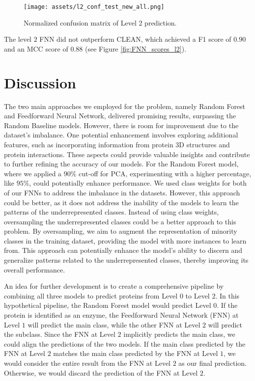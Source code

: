 \documentclass{bioinfo}
\begin{document}
\begin{figure}[!htb]
\texttt{[image: assets/l2\_conf\_test\_new\_all.png]}
\caption{Normalized confusion matrix of Level 2 prediction.}\label{fig:FNN_conf_l2}
\end{figure}

The level $2$ FNN did not outperform CLEAN, which achieved a F1 score of $0.90$ and an MCC score of $0.88$ (see Figure \ref{fig:FNN_scores_l2}).
\section{Discussion}
The two main approaches we employed for the problem, namely Random Forest and Feedforward Neural Network, delivered promising results, surpassing the Random Baseline models.
However, there is room for improvement due to the dataset's imbalance.
One potential enhancement involves exploring additional features, such as incorporating information from protein 3D structures and protein interactions.
These aspects could provide valuable insights and contribute to further refining the accuracy of our models.
For the Random Forest model, where we applied a $90\%$ cut-off for PCA, experimenting with a higher percentage, 
like $95\%$, could potentially enhance performance.
We used class weights for both of our FNNs to address the imbalance in the datasets.
However, this approach could be better, as it does not address the inability of the models to learn the patterns of the underrepresented classes.
Instead of using class weights, oversampling the underrepresented classes could be a better approach to this problem.
By oversampling, we aim to augment the representation of minority classes in the training dataset, 
providing the model with more instances to learn from. 
This approach can potentially enhance the model's ability to discern and generalize patterns related to the underrepresented 
classes, thereby improving its overall performance.

An idea for further development is to create a comprehensive pipeline by combining all three models to predict proteins from Level $0$ to Level $2$.
In this hypothetical pipeline, the Random Forest model would predict Level $0$.
If the protein is identified as an enzyme, the Feedforward Neural Network (FNN) at Level $1$ will predict the main class,
while the other FNN at Level $2$ will predict the subclass.
Since the FNN at Level $2$ implicitly predicts the main class, we could align the predictions of the two models.
If the main class predicted by the FNN at Level $2$ matches the main class predicted by the FNN at Level $1$, 
we would consider the entire result from the FNN at Level $2$ as our final prediction.
Otherwise, we would discard the prediction of the FNN at Level $2$.\\
\end{document}
